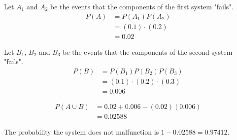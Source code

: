 \documentclass[a4paper]{article}
\begin{document}
\indent Let $A_{1}$ and $A_{2}$ be the events that the components of the first system "fails".
\begin{align*}
P(A) &= P(A_{1})P(A_{2}) \\
     &= (0.1) \cdot (0.2) \\
     &= 0.02
\end{align*}

\indent Let $B_{1}$, $B_{2}$ and $B_{3}$ be the events that the components of the second system "fails".
\begin{align*}
P(B) &= P(B_{1})P(B_{2})P(B_{3}) \\
     &= (0.1) \cdot (0.2) \cdot (0.3) \\
     &= 0.006
\end{align*}

\begin{align*}
P(A \cup B) &= 0.02 + 0.006 - (0.02)(0.006) \\
            &= 0.02588
\end{align*}

\indent The probability the system does not malfunction is $1-0.02588 = 0.97412$.
\end{document}
